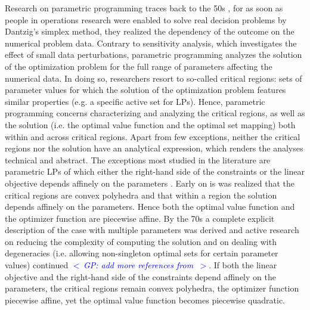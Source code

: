 \documentclass{article}
\newcommand{\commentGP}[1]{\noindent \textcolor{blue}{\emph{$<\,$GP: #1$\,>$}}}%
\begin{document}
Research on parametric programming traces back to the 50s \cite{Saaty_Gass_1954,Gass_Saaty_1955}, for as soon as people in operations research were enabled to solve real decision problems by Dantzig's simplex method, they realized the dependency of the outcome on the numerical problem data. Contrary to sensitivity analysis, which investigates the effect of small data perturbations, parametric programming analyzes the solution of the optimization problem for the full range of parameters affecting the numerical data. In doing so, researchers resort to so-called critical regions: sets of parameter values for which the solution of the optimization problem features similar properties (e.g. a specific active set for LPs). Hence, parametric programming concerns characterizing and analyzing the critical regions, as well as the solution (i.e. the optimal value function and the optimal set mapping) both within and across critical regions. Apart from few exceptions, neither the critical regions nor the solution have an analytical expression, which renders the analyses technical and abstract. The exceptions most studied in the literature are parametric LPs of which either the right-hand side of the constraints or the linear objective depends affinely on the parameters \cite{Gal_1979,Gal_1984}. Early on is was realized that the critical regions are convex polyhedra and that within a region the solution depends affinely on the parameters. Hence both the optimal value function and the optimizer function are piecewise affine. By the 70s a complete explicit description of the case with multiple parameters was derived \cite{Gal_Nedoma_1972} and active research on reducing the complexity of computing the solution and on dealing with degeneracies (i.e. allowing non-singleton optimal sets for certain parameter values) continued \cite{Borrelli_et_al_2003} \commentGP{add more references from \cite{Alessio2009}}. If both the linear objective and the right-hand side of the constraints depend affinely on the parameters, the critical regions remain convex polyhedra, the optimizer function piecewise affine, yet the optimal value function becomes piecewise quadratic.
\end{document}
